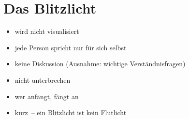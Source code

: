\section{Das Blitzlicht}
\label{blitzlicht}

\begin{itemize}
    \item wird nicht visualisiert
    \item jede Person spricht nur für sich selbst
    \item keine Diskussion (Ausnahme: wichtige Verständnisfragen)
    \item nicht unterbrechen
    \item wer anfängt, fängt an
    \item kurz~-- ein Blitzlicht ist kein Flutlicht
\end{itemize}
